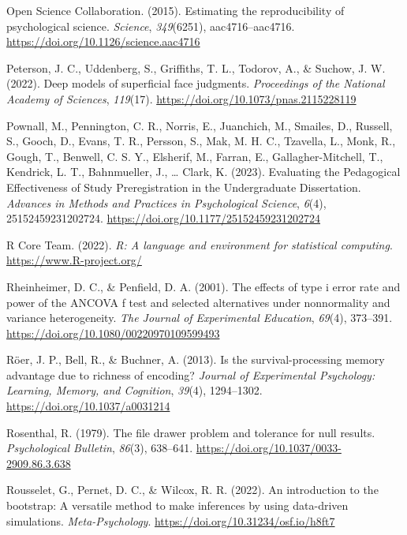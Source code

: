\documentclass[
  man]{apa7}
\newlength{\cslhangindent}
\newlength{\cslentryspacingunit} %
\newenvironment{CSLReferences}[2] %
 {%
  \setlength{\parindent}{0pt}
  \ifodd #1
  \let\oldpar\par
  \def\par{\hangindent=\cslhangindent\oldpar}
  \fi
  \setlength{\parskip}{#2\cslentryspacingunit}
 }%
 {}
\begin{document}
\begin{CSLReferences}{1}{0}
\leavevmode{}%
Open Science Collaboration. (2015). Estimating the reproducibility of psychological science. \emph{Science}, \emph{349}(6251), aac4716--aac4716. \url{https://doi.org/10.1126/science.aac4716}

\leavevmode{}%
Peterson, J. C., Uddenberg, S., Griffiths, T. L., Todorov, A., \& Suchow, J. W. (2022). Deep models of superficial face judgments. \emph{Proceedings of the National Academy of Sciences}, \emph{119}(17). \url{https://doi.org/10.1073/pnas.2115228119}

\leavevmode{}%
Pownall, M., Pennington, C. R., Norris, E., Juanchich, M., Smailes, D., Russell, S., Gooch, D., Evans, T. R., Persson, S., Mak, M. H. C., Tzavella, L., Monk, R., Gough, T., Benwell, C. S. Y., Elsherif, M., Farran, E., Gallagher-Mitchell, T., Kendrick, L. T., Bahnmueller, J., \ldots{} Clark, K. (2023). Evaluating the Pedagogical Effectiveness of Study Preregistration in the Undergraduate Dissertation. \emph{Advances in Methods and Practices in Psychological Science}, \emph{6}(4), 25152459231202724. \url{https://doi.org/10.1177/25152459231202724}

\leavevmode{}%
R Core Team. (2022). \emph{R: A language and environment for statistical computing}. \url{https://www.R-project.org/}

\leavevmode{}%
Rheinheimer, D. C., \& Penfield, D. A. (2001). The effects of type i error rate and power of the ANCOVA f test and selected alternatives under nonnormality and variance heterogeneity. \emph{The Journal of Experimental Education}, \emph{69}(4), 373--391. \url{https://doi.org/10.1080/00220970109599493}

\leavevmode{}%
Röer, J. P., Bell, R., \& Buchner, A. (2013). Is the survival-processing memory advantage due to richness of encoding? \emph{Journal of Experimental Psychology: Learning, Memory, and Cognition}, \emph{39}(4), 1294--1302. \url{https://doi.org/10.1037/a0031214}

\leavevmode{}%
Rosenthal, R. (1979). The file drawer problem and tolerance for null results. \emph{Psychological Bulletin}, \emph{86}(3), 638--641. \url{https://doi.org/10.1037/0033-2909.86.3.638}

\leavevmode{}%
Rousselet, G., Pernet, D. C., \& Wilcox, R. R. (2022). An introduction to the bootstrap: A versatile method to make inferences by using data-driven simulations. \emph{Meta-Psychology}. \url{https://doi.org/10.31234/osf.io/h8ft7}


\end{CSLReferences}
\end{document}
